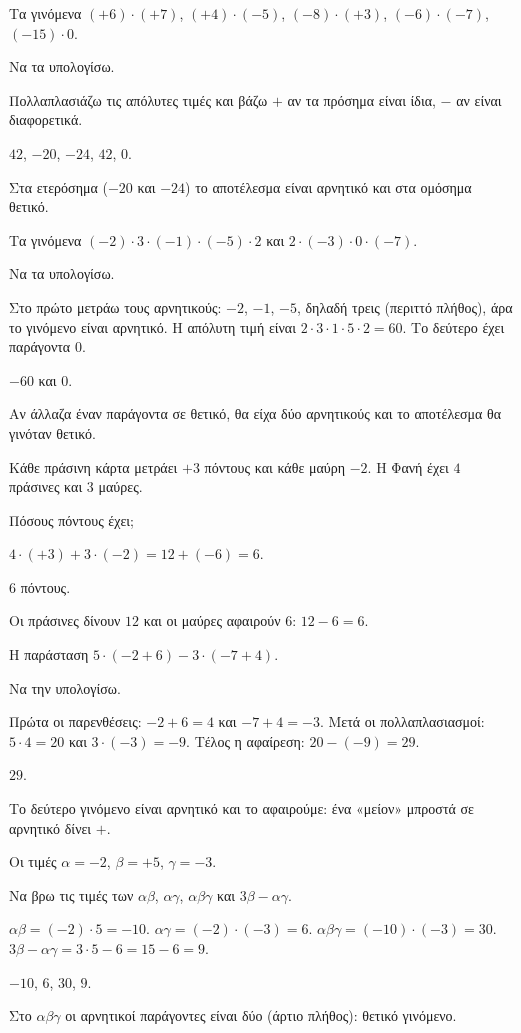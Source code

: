 
\tixero Τα γινόμενα $(+6)\cdot(+7)$, $(+4)\cdot(-5)$, $(-8)\cdot(+3)$, $(-6)\cdot(-7)$, $(-15)\cdot0$.\par
\tithelo Να τα υπολογίσω.\par
\possindeo Πολλαπλασιάζω τις απόλυτες τιμές και βάζω $+$ αν τα πρόσημα είναι ίδια, $-$ αν είναι διαφορετικά.\par
\apantisi $42$, $-20$, $-24$, $42$, $0$.\par
\elegxos Στα ετερόσημα ($-20$ και $-24$) το αποτέλεσμα είναι αρνητικό και στα ομόσημα θετικό.

\tixero Τα γινόμενα $(-2)\cdot3\cdot(-1)\cdot(-5)\cdot2$ και $2\cdot(-3)\cdot0\cdot(-7)$.\par
\tithelo Να τα υπολογίσω.\par
\possindeo Στο πρώτο μετράω τους αρνητικούς: $-2$, $-1$, $-5$, δηλαδή τρεις (περιττό πλήθος), άρα το γινόμενο είναι αρνητικό. Η απόλυτη τιμή είναι $2\cdot3\cdot1\cdot5\cdot2=60$. Το δεύτερο έχει παράγοντα $0$.\par
\apantisi $-60$ και $0$.\par
\elegxos Αν άλλαζα έναν παράγοντα σε θετικό, θα είχα δύο αρνητικούς και το αποτέλεσμα θα γινόταν θετικό.

\tixero Κάθε πράσινη κάρτα μετράει $+3$ πόντους και κάθε μαύρη $-2$. Η Φανή έχει $4$ πράσινες και $3$ μαύρες.\par
\tithelo Πόσους πόντους έχει;\par
\possindeo $4\cdot(+3)+3\cdot(-2)=12+(-6)=6$.\par
\apantisi $6$ πόντους.\par
\elegxos Οι πράσινες δίνουν $12$ και οι μαύρες αφαιρούν $6$: $12-6=6$.

\tixero Η παράσταση $5\cdot(-2+6)-3\cdot(-7+4)$.\par
\tithelo Να την υπολογίσω.\par
\possindeo Πρώτα οι παρενθέσεις: $-2+6=4$ και $-7+4=-3$. Μετά οι πολλαπλασιασμοί: $5\cdot4=20$ και $3\cdot(-3)=-9$. Τέλος η αφαίρεση: $20-(-9)=29$.\par
\apantisi $29$.\par
\elegxos Το δεύτερο γινόμενο είναι αρνητικό και το αφαιρούμε: ένα «μείον» μπροστά σε αρνητικό δίνει $+$.

\tixero Οι τιμές $\alpha=-2$, $\beta=+5$, $\gamma=-3$.\par
\tithelo Να βρω τις τιμές των $\alpha\beta$, $\alpha\gamma$, $\alpha\beta\gamma$ και $3\beta-\alpha\gamma$.\par
\possindeo $\alpha\beta=(-2)\cdot5=-10$. $\alpha\gamma=(-2)\cdot(-3)=6$. $\alpha\beta\gamma=(-10)\cdot(-3)=30$. $3\beta-\alpha\gamma=3\cdot5-6=15-6=9$.\par
\apantisi $-10$, $6$, $30$, $9$.\par
\elegxos Στο $\alpha\beta\gamma$ οι αρνητικοί παράγοντες είναι δύο (άρτιο πλήθος): θετικό γινόμενο.

